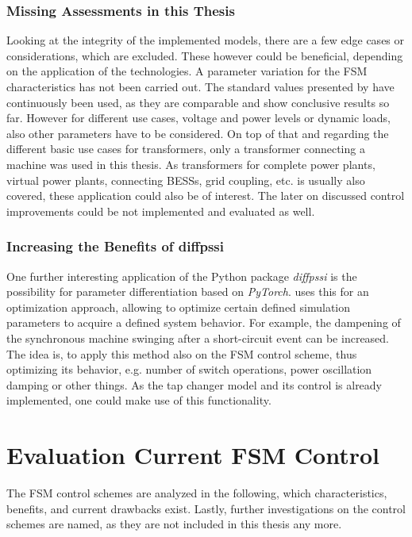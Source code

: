 \subsubsection{Missing Assessments in this Thesis}

Looking at the integrity of the implemented models, there are a few edge cases or considerations, which are excluded.
These however could be beneficial, depending on the application of the technologies.
A parameter variation for the \acs{FSM} characteristics has not been carried out.
The standard values presented by \textcite{burlakin_2024} have continuously been used, as they are comparable and show conclusive results so far.
However for different use cases, voltage and power levels or dynamic loads, also other parameters have to be considered.
On top of that and regarding the different basic use cases for transformers, only a transformer connecting a machine was used in this thesis.
As transformers for complete power plants, virtual power plants, connecting \acp{BESS}, grid coupling, etc. \autocite{schwab_2022} is usually also covered, these application could also be of interest.
The later on discussed control improvements could be not implemented and evaluated as well.

\subsubsection{Increasing the Benefits of diffpssi}

One further interesting application of the Python package \textit{diffpssi} is the possibility for parameter differentiation based on \textit{PyTorch}.
\textcite{kordowich_2023} uses this for an optimization approach, allowing to optimize certain defined simulation parameters to acquire a defined system behavior.
For example, the dampening of the synchronous machine swinging after a short-circuit event can be increased.
The idea is, to apply this method also on the \acs{FSM} control scheme, thus optimizing its behavior, e.g. number of switch operations, power oscillation damping or other things.
As the tap changer model and its control is already implemented, one could make use of this functionality.

\section{Evaluation Current FSM Control}

The \acs{FSM} control schemes are analyzed in the following, which characteristics, benefits, and current drawbacks exist.
Lastly, further investigations on the control schemes are named, as they are not included in this thesis any more.

